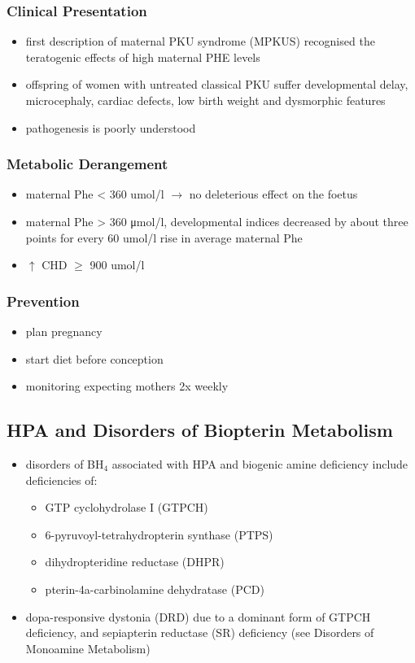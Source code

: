 \documentclass{scrartcl}
\begin{document}
\subsubsection{Clinical Presentation}
\label{sec:org5e9e641}
\begin{itemize}
\item first description of maternal PKU syndrome (MPKUS) recognised the
teratogenic effects of high maternal PHE levels
\item offspring of women with untreated classical PKU suffer developmental
delay, microcephaly, cardiac defects, low birth weight and
dysmorphic features
\item pathogenesis is poorly understood
\end{itemize}
\subsubsection{Metabolic Derangement}
\label{sec:org8adbe59}
\begin{itemize}
\item maternal Phe \textless{} 360 umol/l \(\to\) no deleterious effect on the foetus
\item maternal Phe \textgreater{} 360 μmol/l, developmental indices decreased by
about three points for every 60 umol/l rise in average maternal Phe
\item \(\uparrow\) CHD \(\ge\) 900 umol/l
\end{itemize}
\subsubsection{Prevention}
\label{sec:org40b193f}
\begin{itemize}
\item plan pregnancy
\item start diet before conception
\item monitoring expecting mothers 2x weekly
\end{itemize}

\subsection{HPA and Disorders of Biopterin Metabolism}
\label{sec:org5fe3e74}
\begin{itemize}
\item disorders of BH\(_{\text{4}}\) associated with HPA and biogenic amine deficiency
include deficiencies of:
\begin{itemize}
\item GTP cyclohydrolase I (GTPCH)
\item 6-pyruvoyl-tetrahydropterin synthase (PTPS)
\item dihydropteridine reductase (DHPR)
\item pterin-4a-carbinolamine dehydratase (PCD)
\end{itemize}
\item dopa-responsive dystonia (DRD) due to a dominant form of GTPCH
deficiency, and sepiapterin reductase (SR) deficiency (see Disorders of Monoamine Metabolism)
\end{itemize}
\end{document}
